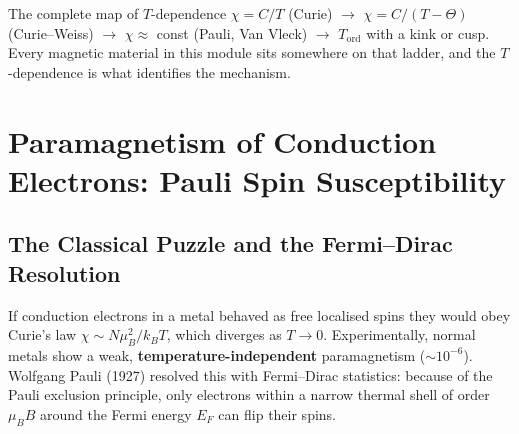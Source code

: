 \documentclass[11pt,a4paper]{article}
\begin{document}
\begin{takeawaybox}{The complete map of $T$-dependence}
$\chi = C/T$ (Curie) $\rightarrow$ $\chi = C/(T-\Theta)$ (Curie--Weiss) $\rightarrow$ $\chi \approx$ const (Pauli, Van Vleck) $\rightarrow$ $T_{\mathrm{ord}}$ with a kink or cusp. Every magnetic material in this module sits somewhere on that ladder, and the $T$-dependence is what identifies the mechanism.
\end{takeawaybox}

\section{Paramagnetism of Conduction Electrons: Pauli Spin Susceptibility}
\label{ch:itinerant}

\subsection{The Classical Puzzle and the Fermi--Dirac Resolution}

If conduction electrons in a metal behaved as free localised spins they would obey Curie's law $\chi\sim N\mu_B^2/k_BT$, which diverges as $T\to0$. Experimentally, normal metals show a weak, \textbf{temperature-independent} paramagnetism ($\sim10^{-6}$). Wolfgang Pauli (1927) resolved this with Fermi--Dirac statistics: because of the Pauli exclusion principle, only electrons within a narrow thermal shell of order $\mu_BB$ around the Fermi energy $E_F$ can flip their spins.
\end{document}
